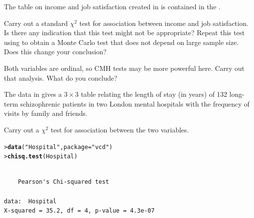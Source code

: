 \documentclass[10pt]{report}\usepackage[]{graphicx}\usepackage[]{color}
\makeatletter
\newcommand{\hlstr}[1]{\textcolor[rgb]{0.192,0.494,0.8}{#1}}%
\newcommand{\hlstd}[1]{\textcolor[rgb]{0.345,0.345,0.345}{#1}}%
\newcommand{\hlkwc}[1]{\textcolor[rgb]{0.333,0.667,0.333}{#1}}%
\newcommand{\hlkwd}[1]{\textcolor[rgb]{0.737,0.353,0.396}{\textbf{#1}}}%
\newenvironment{kframe}{%
 \def\at@end@of@kframe{}%
 \ifinner\ifhmode%
  \def\at@end@of@kframe{\end{minipage}}%
  \begin{minipage}{\columnwidth}%
 \fi\fi%
 \def\FrameCommand##1{\hskip\@totalleftmargin \hskip-\fboxsep
 \colorbox{shadecolor}{##1}\hskip-\fboxsep
     \hskip-\linewidth \hskip-\@totalleftmargin \hskip\columnwidth}%
 \MakeFramed {\advance\hsize-\width
   \@totalleftmargin\z@ \linewidth\hsize
   \@setminipage}}%
 {\par\unskip\endMakeFramed%
 \at@end@of@kframe}
\newenvironment{knitrout}{}{} %
\renewenvironment{knitrout}{\small\renewcommand{\baselinestretch}{.85}}{} %
\makeatother
\begin{document}
\begin{Exercises}
  \exercise The  table on income and job satisfaction
  created in  is contained in the
  .
  \begin{enumerate*}
    \item Carry out a standard $\chi^2$ test for association between income and job satisfaction.
    Is there any indication that this test might not be appropriate?
      Repeat this test using  to obtain a Monte Carlo
      test that does not depend on large sample size.  Does this change your
      conclusion?
    \begin{ans}
    \end{ans}
    
    \item Both variables are ordinal, so CMH tests may be more powerful here.
    Carry out that analysis.  What do you conclude?
    \begin{ans}
    \end{ans}
    
  \end{enumerate*}

  \exercise The  data in  gives a $3 \times 3$ table
  relating the length of stay (in years) of 132 long-term schizophrenic patients in two London mental hospitals with the frequency of visits
  by family and friends.
    \begin{enumerate*}
      \item Carry out a  $\chi^2$ test for association between the two
      variables.
      \begin{ans}
\begin{knitrout}\footnotesize
{}\color{fgcolor}\begin{kframe}
\begin{alltt}
\hlstd{> }\hlkwd{data}\hlstd{(}\hlstr{"Hospital"}\hlstd{,} \hlkwc{package}\hlstd{=}\hlstr{"vcd"}\hlstd{)}
\hlstd{> }\hlkwd{chisq.test}\hlstd{(Hospital)}
\end{alltt}
\begin{verbatim}

	Pearson's Chi-squared test

data:  Hospital
X-squared = 35.2, df = 4, p-value = 4.3e-07
\end{verbatim}
\end{kframe}
\end{knitrout}
      \end{ans}
      

\end{enumerate*}
\end{Exercises}
\end{document}
